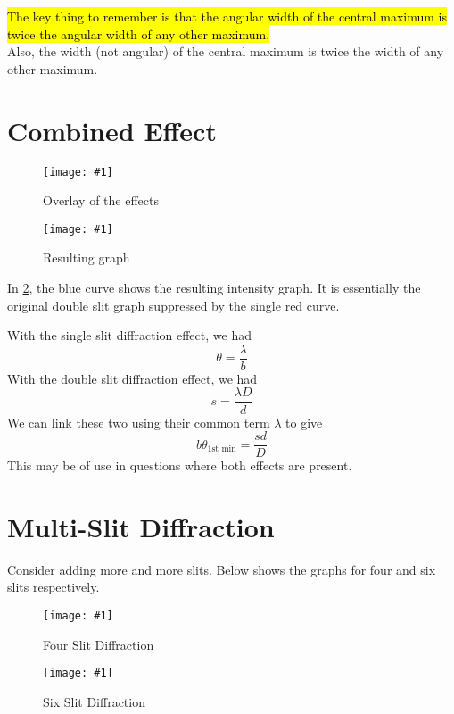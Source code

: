\documentclass[a4paper,12pt]{article}
\let\oldsection\section
\renewcommand\section{\clearpage\oldsection}
\newcommand{\lb}{\\[8pt]}
\newcommand{\img}[4]{\begin{center}
  \begin{figure}[H]
    \centering
    \texttt{[image: \#1]}
    \caption{#3}
    \label{fig:#4}
  \end{figure}
\end{center}}
\begin{document}
\hl{The key thing to remember is that the angular width of the central maximum is twice the angular width of any other maximum.}\lb
Also, the width (not angular) of the central maximum is twice the width of any other maximum.

\section{Combined Effect}

\begin{minipage}{0.475\textwidth}
  \img{combine1.png}{1}{Overlay of the effects}{combined}
\end{minipage}\hspace*{0.05\textwidth}%
\begin{minipage}{0.475\textwidth}
  \img{combine2.png}{1}{Resulting graph}{combined2}
\end{minipage}

In \cref{fig:combined2}, the blue curve shows the resulting intensity graph. It is essentially the original double slit graph suppressed by the single red curve.

With the single slit diffraction effect, we had $$\theta = \frac{\lambda}{b}$$
With the double slit diffraction effect, we had $$s = \frac{\lambda D}{d}$$
We can link these two using their common term $\lambda$ to give
$$b\theta_\text{1st min} = \frac{sd}{D}$$
This may be of use in questions where both effects are present.


\section{Multi-Slit Diffraction}

Consider adding more and more slits. Below shows the graphs for four and six slits respectively.

\begin{minipage}{0.475\textwidth}
  \img{fourslit.png}{1}{Four Slit Diffraction}{fourslit}
\end{minipage}\hspace*{0.05\textwidth}%
\begin{minipage}{0.475\textwidth}
  \img{sixslit.png}{1}{Six Slit Diffraction}{sixslit}
\end{minipage}
\end{document}
